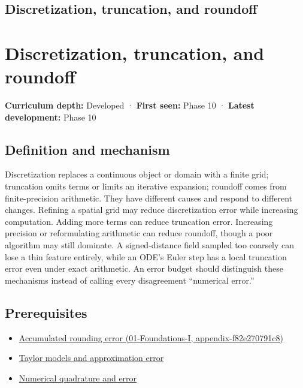 \hypertarget{appendix-6b0648b2b8e8}{}
\section*{Discretization, truncation, and roundoff}
\chapter{Discretization, truncation, and roundoff}\label{appendix-6b0648b2b8e8-discretization-truncation-and-roundoff}

\textbf{Curriculum depth:} Developed · \textbf{First seen:} Phase 10 · \textbf{Latest development:} Phase 10

\section{Definition and mechanism}\label{appendix-6b0648b2b8e8-definition-and-mechanism}

Discretization replaces a continuous object or domain with a finite grid; truncation omits terms or limits an iterative expansion; roundoff comes from finite-precision arithmetic. They have different causes and respond to different changes. Refining a spatial grid may reduce discretization error while increasing computation. Adding more terms can reduce truncation error. Increasing precision or reformulating arithmetic can reduce roundoff, though a poor algorithm may still dominate. A signed-distance field sampled too coarsely can lose a thin feature entirely, while an ODE's Euler step has a local truncation error even under exact arithmetic. An error budget should distinguish these mechanisms instead of calling every disagreement ``numerical error.''

\section{Prerequisites}\label{appendix-6b0648b2b8e8-prerequisites}

\begin{itemize}
\tightlist
\item
  \href{../01-Foundations-I/main.pdf\#nameddest=appendix-f82e270791c8}{Accumulated rounding error (01-Foundations-I, appendix-f82e270791c8)}
\item
  \hyperref[appendix-32f39e9a3738]{Taylor models and approximation error}
\item
  \hyperref[appendix-80521eae6b71]{Numerical quadrature and error}
\end{itemize}

